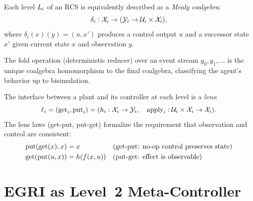 \documentclass[11pt,a4paper]{article}
\begin{document}
\begin{definition}
\label{def:mealy}
Each level $L_{i}$ of an RCS is equivalently described as a \emph{Mealy
coalgebra}:
\begin{equation}
  \delta_i : \mathcal{X}_i \to (\mathcal{Y}_i \to \mathcal{U}_i \times \mathcal{X}_i),
\end{equation}
where $\delta_i(x)(y) = (u, x')$ produces a control output $u$ and a
successor state $x'$ given current state $x$ and observation $y$.

The fold operation (deterministic reducer) over an event stream
$y_0, y_1, \ldots$ is the unique coalgebra homomorphism to the final
coalgebra, classifying the agent's behavior up to bisimulation.
\end{definition}

\begin{definition}
\label{def:lens}
The interface between a plant and its controller at each level is a
\emph{lens}:
\begin{equation}
  \ell_i = (\text{get}_i, \text{put}_i)
  = (h_i : \mathcal{X}_i \to \mathcal{Y}_i, \quad
     \text{apply}_i : \mathcal{U}_i \times \mathcal{X}_i \to \mathcal{X}_i).
\end{equation}
The lens laws (get-put, put-get) formalize the requirement that observation
and control are consistent:
\begin{align}
  \text{put}(\text{get}(x), x) &= x
  & &\text{(get-put: no-op control preserves state)} \\
  \text{get}(\text{put}(u, x)) &= h(f(x, u))
  & &\text{(put-get: effect is observable)}
\end{align}
\end{definition}


\section{EGRI as Level~2 Meta-Controller}
\label{sec:egri}
\end{document}
